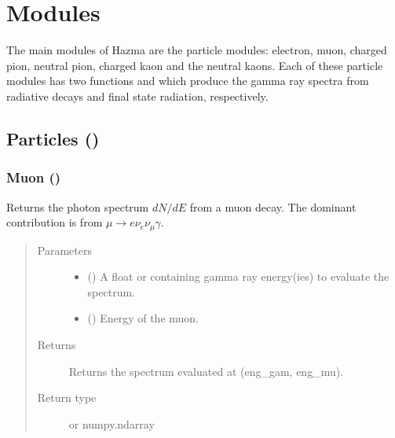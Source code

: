 \documentclass[letterpaper,10pt,english]{sphinxmanual}
\begin{document}
\chapter{Modules}
\label{\detokenize{Modules:modules}}\label{\detokenize{Modules::doc}}
The main modules of Hazma are the particle modules: electron, muon, charged pion, neutral pion, charged kaon and the neutral kaons. Each of these particle modules has two functions  and  which produce the gamma ray spectra from radiative decays and final state radiation, respectively.


\section{Particles ()}
\label{\detokenize{Modules:particles-hazma-particles}}

\subsection{Muon ()}
\label{\detokenize{Modules:muon-hazma-particles-muon}}

\begin{fulllineitems}
\label{\detokenize{Modules:muon.decay_spectra}}
Returns the photon spectrum \(dN/dE\) from a muon decay. The dominant contribution is from \(\mu\to e\nu_{e}\nu_{\mu}\gamma\).
\begin{quote}\begin{description}
\item[{Parameters}] \leavevmode\begin{itemize}
\item {} 
 () \textendash{} A float or  containing gamma ray energy(ies) to evaluate the spectrum.

\item {} 
 () \textendash{} Energy of the muon.

\end{itemize}

\item[{Returns}] \leavevmode
Returns the spectrum evaluated at (eng\_gam, eng\_mu).

\item[{Return type}] \leavevmode
{} or numpy.ndarray

\end{description}\end{quote}

\end{fulllineitems}
\end{document}
